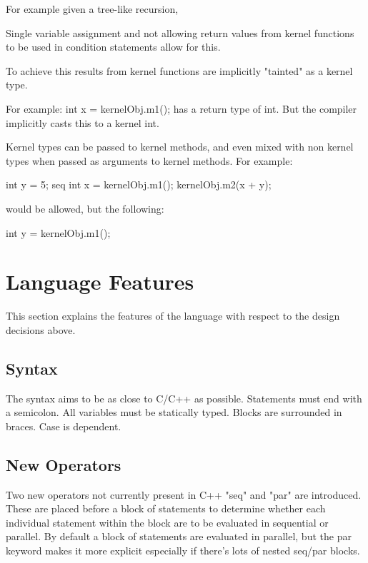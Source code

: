         For example given a tree-like
        recursion, 
        
        Single variable assignment
        and not allowing return values from kernel functions
        to be used in condition statements allow for this.

        To achieve this results from kernel functions are implicitly
        "tainted" as a kernel type.

        For example:
            int x = kernelObj.m1();
        has a return type of int.
        But the compiler implicitly casts this to a 
        kernel int.

        Kernel types can be passed to kernel methods, and even
        mixed with non kernel types when passed as arguments to
        kernel methods. For example:

        int y = 5;
        seq {
            int x = kernelObj.m1();
            kernelObj.m2(x + y);
        }

        would be allowed, but the following:

        int y = kernelObj.m1();



\section{Language Features}

    This section explains the features of the language with respect to the design decisions above.

\subsection{Syntax}
        The syntax aims to be as close to C/C++ as possible. Statements must end with a semicolon. 
        All variables must be statically typed. Blocks are surrounded in braces. Case is dependent.

\subsection{New Operators}
        Two new operators not currently present in C++ "seq" and "par" are introduced. 
        These are placed before a block
        of statements to determine whether each individual statement within the block are
        to be evaluated in sequential or parallel. By default a block of statements are evaluated
        in parallel, but the par keyword makes it more explicit especially if there's lots of nested
        seq/par blocks.

